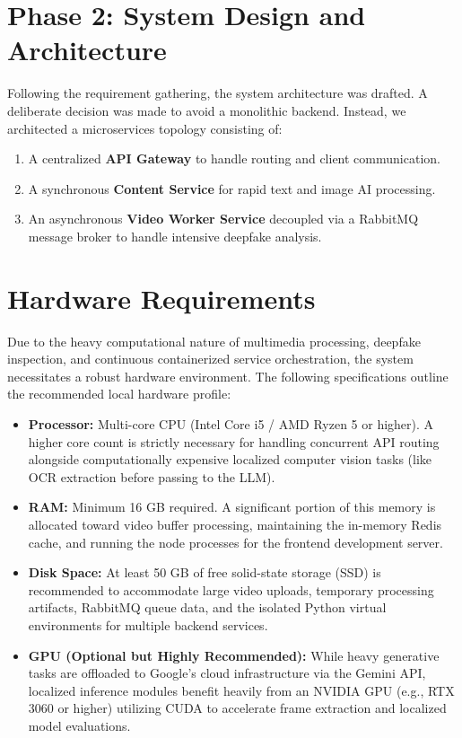 \section{Phase 2: System Design and Architecture}
Following the requirement gathering, the system architecture was drafted. A deliberate decision was made to avoid a monolithic backend. Instead, we architected a microservices topology consisting of:
\begin{enumerate}
    \item A centralized \textbf{API Gateway} to handle routing and client communication.
    \item A synchronous \textbf{Content Service} for rapid text and image AI processing.
    \item An asynchronous \textbf{Video Worker Service} decoupled via a RabbitMQ message broker to handle intensive deepfake analysis.
\end{enumerate}

\section{Hardware Requirements}
Due to the heavy computational nature of multimedia processing, deepfake inspection, and continuous containerized service orchestration, the system necessitates a robust hardware environment. The following specifications outline the recommended local hardware profile:

\begin{itemize}
    \item \textbf{Processor:} Multi-core CPU (Intel Core i5 / AMD Ryzen 5 or higher). A higher core count is strictly necessary for handling concurrent API routing alongside computationally expensive localized computer vision tasks (like OCR extraction before passing to the LLM).
    \item \textbf{RAM:} Minimum 16 GB required. A significant portion of this memory is allocated toward video buffer processing, maintaining the in-memory Redis cache, and running the node processes for the frontend development server.
    \item \textbf{Disk Space:} At least 50 GB of free solid-state storage (SSD) is recommended to accommodate large video uploads, temporary processing artifacts, RabbitMQ queue data, and the isolated Python virtual environments for multiple backend services.
    \item \textbf{GPU (Optional but Highly Recommended):} While heavy generative tasks are offloaded to Google's cloud infrastructure via the Gemini API, localized inference modules benefit heavily from an NVIDIA GPU (e.g., RTX 3060 or higher) utilizing CUDA to accelerate frame extraction and localized model evaluations.
\end{itemize}

